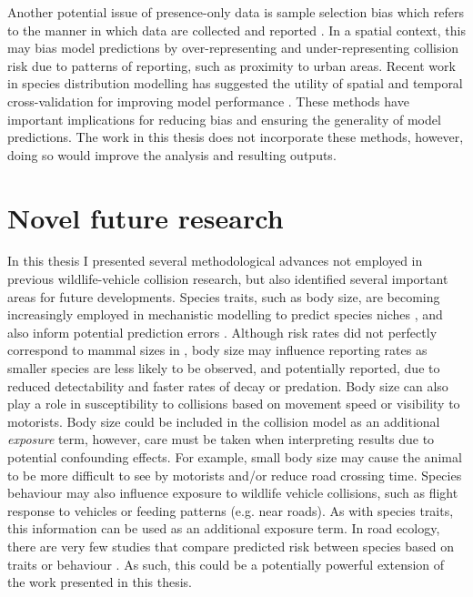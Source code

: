 Another potential issue of presence-only data is sample selection bias which refers to the manner in which data are collected and reported \citep{phil09}. In a spatial context, this may bias model predictions by over-representing and under-representing collision risk due to patterns of reporting, such as proximity to urban areas. Recent work in species distribution modelling has suggested the utility of spatial and temporal cross-validation for improving model performance \citep{weng12,robe17}. These methods have important implications for reducing bias and ensuring the generality of model predictions. The work in this thesis does not incorporate these methods, however, doing so would improve the analysis and resulting outputs.\vfill

\section{Novel future research}

In this thesis I presented several methodological advances not employed in previous wildlife-vehicle collision research, but also identified several important areas for future developments. Species traits, such as body size, are becoming increasingly employed in mechanistic modelling to predict species niches \citep{kear09}, and also  inform potential prediction errors \citep[e.g.][]{seoa05}. Although risk rates did not perfectly correspond to mammal sizes in , body size may influence reporting rates as smaller species are less likely to be observed, and potentially reported, due to reduced detectability and faster rates of decay or predation. Body size can also play a role in susceptibility to collisions based on movement speed \citep{jaar06} or visibility to motorists. Body size could be included in the collision model as an additional \textit{exposure} term, however, care must be taken when interpreting results due to potential confounding effects. For example, small body size may cause the animal to be more difficult to see by motorists and/or reduce road crossing time. Species behaviour may also influence exposure to wildlife vehicle collisions, such as flight response to vehicles \citep{deva14,lee10} or feeding patterns (e.g. near roads). As with species traits, this information can be used as an additional exposure term. In road ecology, there are very few studies that compare predicted risk between species based on traits or behaviour \citep[but see][]{litv08}. As such, this could be a potentially powerful extension of the work presented in this thesis. 

